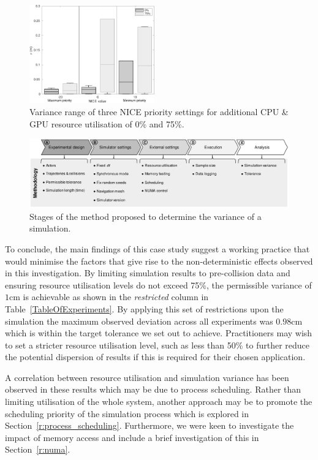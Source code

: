 \begin{figure}[t]
    \centering
    \includegraphics[width=0.48\textwidth]{../other/figures/NICE_analysis_summary_V4.pdf}
    \caption{Variance range of three NICE priority settings for additional CPU \& GPU resource utilisation of 0\% and 75\%.}
    \label{NICEExperimentStressSummary}
\end{figure}

\begin{figure}[t]
    \centering
    \includegraphics[width=0.99\linewidth]{../other/figures/Methodology_Diagram_v8.pdf}
    \caption{Stages of the method proposed to determine the variance of a simulation.}
    \label{method_diagram}
\end{figure}

To conclude, the main findings of this case study suggest a working practice that would minimise the factors that give rise to the non-deterministic effects observed in this investigation. By limiting simulation results to pre-collision data and ensuring resource utilisation levels do not exceed 75\%, the permissible variance of $1$cm is achievable as shown in the \textit{restricted} column in Table~\ref{TableOfExperiments}. By applying this set of restrictions upon the simulation the maximum observed deviation across all experiments was $0.98$cm which is within the target tolerance we set out to achieve. 
%
Practitioners may wish to set a stricter resource utilisation level, such as less than 50\% to further reduce the potential dispersion of results if this is required for their chosen application. 

A correlation between resource utilisation and simulation variance has been observed in these results which may be due to process scheduling. Rather than limiting utilisation of the whole system, another approach may be to promote the scheduling priority of the simulation process which is explored in Section~\ref{r:process_scheduling}. Furthermore, we were keen to investigate the impact of memory access and include a brief investigation of this in Section~\ref{r:numa}. 

